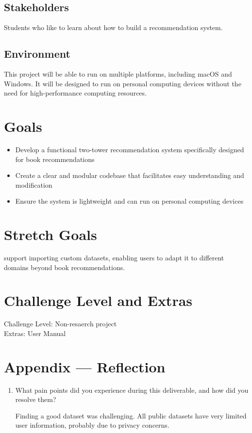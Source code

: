 \documentclass{article}
\begin{document}
\subsection{Stakeholders}

Students who like to learn about how to build a recommendation system.

\subsection{Environment}
This project will be able to run on multiple platforms, including macOS and Windows. It will be designed to run on personal computing devices without the need for high-performance computing resources.

\section{Goals}
\begin{itemize}
    \item Develop a functional two-tower recommendation system specifically designed for book recommendations
    \item Create a clear and modular codebase that facilitates easy understanding and modification
    \item Ensure the system is lightweight and can run on personal computing devices
\end{itemize}

\section{Stretch Goals}
support importing custom datasets, enabling users to adapt it to different domains beyond book recommendations.
\section{Challenge Level and Extras}
Challenge Level: Non-resaerch project \\
Extras: User Manual


\newpage{}

\section*{Appendix --- Reflection}

\begin{enumerate}
    \item What pain points did you experience during this deliverable, and how did you resolve them?
    
        Finding a good dataset was challenging. All public datasets have very limited user information, probably due to privacy concerns.

\end{enumerate}  
\end{document}
